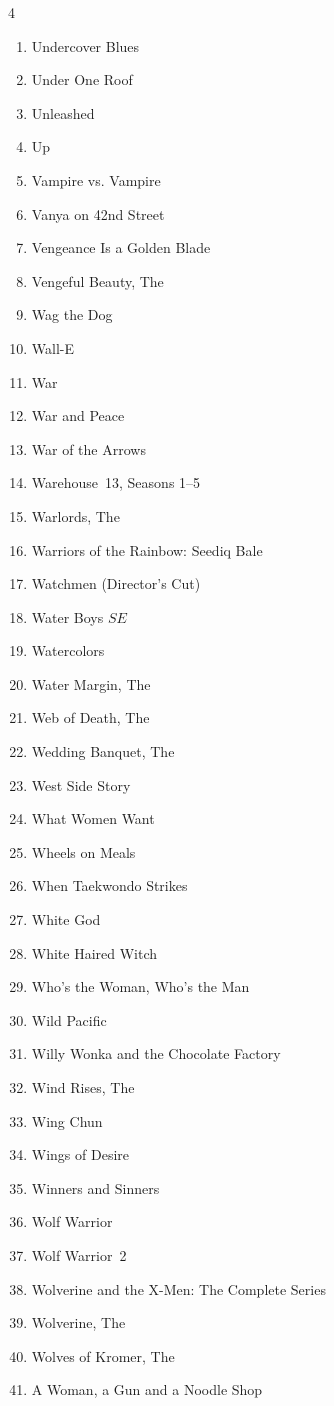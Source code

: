 \documentclass{article}
\newcommand\SE{\(SE\)}
\begin{document}
\begin{multicols}{4}
\begin{enumerate}
\item Undercover Blues
\item Under One Roof
\item Unleashed
\item Up
\item Vampire vs. Vampire
\item Vanya on 42nd Street
\item Vengeance Is a Golden Blade
\item Vengeful Beauty, The
\item Wag the Dog
\item Wall-E
\item War
\item War and Peace
\item War of the Arrows
\item Warehouse~13, Seasons 1--5
\item Warlords, The
\item Warriors of the Rainbow: Seediq Bale
\item Watchmen (Director's Cut)
\item Water Boys \SE
\item Watercolors
\item Water Margin, The
\item Web of Death, The
\item Wedding Banquet, The
\item West Side Story
\item What Women Want
\item Wheels on Meals
\item When Taekwondo Strikes
\item White God
\item White Haired Witch
\item Who's the Woman, Who's the Man
\item Wild Pacific
\item Willy Wonka and the Chocolate Factory
\item Wind Rises, The
\item Wing Chun
\item Wings of Desire
\item Winners and Sinners
\item Wolf Warrior
\item Wolf Warrior~2
\item Wolverine and the X-Men: The Complete Series
\item Wolverine, The
\item Wolves of Kromer, The
\item A Woman, a Gun and a Noodle Shop

\end{enumerate}
\end{multicols}
\end{document}
